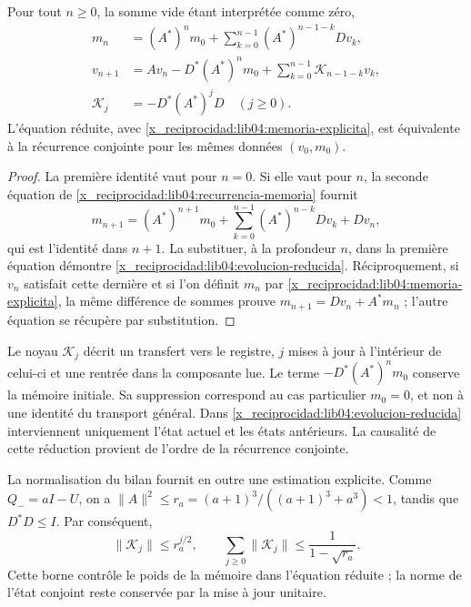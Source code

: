\begin{proposition}
\label{x_reciprocidad:lib04:prop-memoria-reducida}
Pour tout \(n\geq0\), la somme vide étant interprétée comme zéro,
\begin{align}
 m_n&=(A^*)^n m_0+
       \sum_{k=0}^{n-1}(A^*)^{n-1-k}Dv_k,
       \label{x_reciprocidad:lib04:memoria-explicita}\\
 v_{n+1}&=Av_n-D^*(A^*)^n m_0
       +\sum_{k=0}^{n-1}\mathscr K_{n-1-k}v_k,
       \label{x_reciprocidad:lib04:evolucion-reducida}\\
 \mathscr K_j&=-D^*(A^*)^jD\quad(j\geq0).
       \label{x_reciprocidad:lib04:nucleo-retardo}
\end{align}
L’équation réduite, avec \eqref{x_reciprocidad:lib04:memoria-explicita}, est
équivalente à la récurrence conjointe pour les mêmes données \((v_0,m_0)\).
\end{proposition}
\begin{proof}
La première identité vaut pour \(n=0\). Si elle vaut pour \(n\), la seconde équation de \eqref{x_reciprocidad:lib04:recurrencia-memoria} fournit
\[
 m_{n+1}=(A^*)^{n+1}m_0+
 \sum_{k=0}^{n-1}(A^*)^{n-k}Dv_k+Dv_n,
\]
qui est l’identité dans \(n+1\). La substituer, à la profondeur \(n\), dans
la première équation démontre \eqref{x_reciprocidad:lib04:evolucion-reducida}.
Réciproquement, si \(v_n\) satisfait cette dernière et si l’on définit \(m_n\)
par \eqref{x_reciprocidad:lib04:memoria-explicita}, la même différence de sommes prouve
\(m_{n+1}=Dv_n+A^*m_n\) ; l’autre équation se récupère par substitution.
\end{proof}

Le noyau \(\mathscr K_j\) décrit un transfert vers le registre, \(j\) mises à jour à l'intérieur de celui-ci et une rentrée dans la composante lue. Le terme \(-D^*(A^*)^nm_0\) conserve la mémoire initiale. Sa suppression correspond au cas particulier \(m_0=0\), et non à une identité du transport général. Dans \eqref{x_reciprocidad:lib04:evolucion-reducida} interviennent uniquement l'état actuel et les états antérieurs. La causalité de cette réduction provient de l'ordre de la récurrence conjointe.

La normalisation du bilan fournit en outre une estimation explicite.
Comme \(Q_-=aI-U\), on a
\(\|A\|^2\leq r_a=(a+1)^3/((a+1)^3+a^3)<1\), tandis que
\(D^*D\leq I\). Par conséquent,
\begin{equation}
 \|\mathscr K_j\|\leq r_a^{j/2},\qquad
 \sum_{j\geq0}\|\mathscr K_j\|
 \leq\frac{1}{1-\sqrt{r_a}}.
 \label{x_reciprocidad:lib04:cota-nucleo-retardo}
\end{equation}
Cette borne contrôle le poids de la mémoire dans l’équation réduite ; la norme
de l’état conjoint reste conservée par la mise à jour unitaire.

